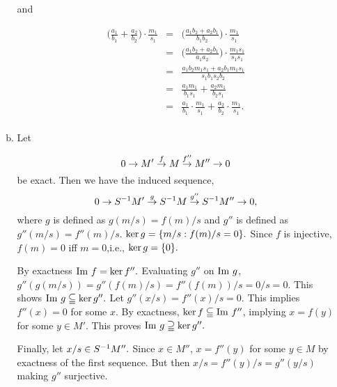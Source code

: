 \documentclass{article}
\theoremstyle{definition}
\theoremstyle{remark}
\begin{document}
\begin{enumerate}[(1)]
\begin{enumerate}[(a)]
                and

                \begin{eqnarray*}
                  \bigg( \frac{a_1}{b_1} + \frac{a_2}{b_2} \bigg) \cdot \frac{m_1}{s_1}  & = &  \bigg( \frac{a_1b_2 + a_2b_1}{b_1b_2} \bigg) \cdot  \frac{m_1}{s_1} \\
                                                                                          & = &  \bigg(\frac {a_1b_2 + a_2b_1}{a_1a_2} \bigg) \cdot \frac{m_1s_1}{s_1s_1}  \\
                                                                                          & = &  \frac{a_1b_2m_1s_1 + a_2b_1m_1s_1}{s_1b_1s_2b_2} \\
                                                                                          & = &  \frac{a_1m_1}{b_1s_1} + \frac{a_2m_1}{b_2s_1} \\
                                                                                          & = &  \frac{a_1}{b_1}\cdot \frac{m_1}{s_1} + \frac{a_2}{b_2}\cdot \frac{m_1}{s_1}.  \\
                \end{eqnarray*}

          \item Let

                $$0 \to M' \overset{f}{\to} M \overset{f''}{\to} M'' \to 0$$
                be exact. Then we have the induced sequence,
                $$0 \to {S}^{-1}M' \overset{g}{\to} {S}^{-1}M \overset{g''}{\to} {S}^{-1}M'' \to 0, $$
                where $g$ is defined as $g(m/s) = f(m)/s$ and $g''$ is defined as $g''(m/s) = f''(m)/s.$ $\ker g  = \{m/s : f(m)/s = 0\}.$ Since $f$ is injective, $f(m) = 0$ iff $m = 0$,i.e., $\ker g = \{0\}.$

                By exactness $\mathrm{Im}\  f  = \ker f''.$ Evaluating $g''$ on $\mathrm{Im}\  g$,  $g''(g(m/s)) = g''(f(m)/s) = f''(f(m))/s = 0/s =0$. This shows $\mathrm{Im}\  g \subseteqq \ker g''.$ Let $g''(x/s) = f''(x)/s  = 0.$ This implies $f''(x) = 0$ for some $x$. By exactness, $\ker f \subseteqq \mathrm{Im}\  f''$, implying $x = f(y)$ for some $y \in M'.$ This proves $\mathrm{Im}\  g \supseteqq \ker g''.$

                Finally, let $x/s \in {S}^{-1}M''.$ Since $x \in M''$, $x = f''(y)$ for some $y \in M$ by exactness of the first sequence. But then $x/s = f''(y)/s = g''(y/s)$ making $g''$ surjective.
        \end{enumerate}

\end{enumerate}
\end{document}
